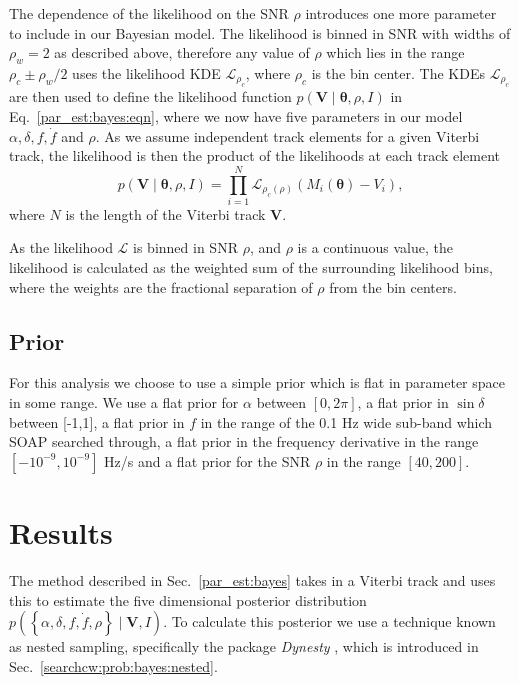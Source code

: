 The dependence of the likelihood on the \gls{SNR} $\rho$ introduces one more parameter
to include in our Bayesian model.  
The likelihood is binned in \gls{SNR} with widths of $\rho_w = 2$ as described above, therefore any value of $\rho$ which lies in the range $\rho_c \pm \rho_w/2 $ uses the likelihood \gls{KDE} $\mathcal{L}_{\rho_c}$, where $\rho_c$ is the bin center.
The \glspl{KDE} $\mathcal{L}_{\rho_c}$ are then used to define the likelihood function $p(\bm{V} \mid
\bm{\theta}, \rho, I)$ in Eq.~\ref{par_est:bayes:eqn}, where we now have five parameters in our model
$\alpha, \delta, f, \dot{f}$ and $\rho$.  As we assume
independent track elements for a given Viterbi track, the likelihood is then the product of the likelihoods at each track element
%
\begin{equation} 
p(\bm{V} \mid \bm{\theta}, \rho, I) = \prod_{i =
1}^{N} \mathcal{L}_{\rho_c(\rho)}(M_i(\bm{\theta}) - V_i) , 
\end{equation} 
%
where $N$ is the length of the Viterbi track $\bm{V}$. 

\if
As the likelihood $\mathcal{L}$ is binned in \gls{SNR} $\rho$, and $\rho$ is a
continuous value, the likelihood is calculated as the weighted sum of the
surrounding likelihood bins, where the weights are the fractional separation of
$\rho$ from the bin centers.  
\fi

%
\subsection{Prior}
%
For this analysis we choose to use a simple prior which is flat in parameter space in some range.  We use a flat prior for $\alpha$
between $[0,2\pi]$, a flat prior in $\sin{\delta}$ between [-1,1], a flat prior
in $f$ in the range of the 0.1 Hz wide sub-band which SOAP searched through, a
flat prior in the frequency derivative in the range
$[-10^{-9},10^{-9}]$ Hz/s and a flat prior for the \gls{SNR} $\rho$ in
the range $[40,200]$.


\section{\label{par_est:results}Results}

The method described in Sec.~\ref{par_est:bayes} takes in a Viterbi track and
uses this to estimate the five dimensional posterior distribution
$p\left(\left\{ \alpha, \delta, f, \dot{f}, \rho \right\} \mid \bm{V}, I
\right)$.  To calculate this posterior we use a technique known as nested
sampling, specifically the package {\it Dynesty}
\citep{speagle2019DynestyDynamic}, which is introduced in
Sec.~\ref{searchcw:prob:bayes:nested}.

